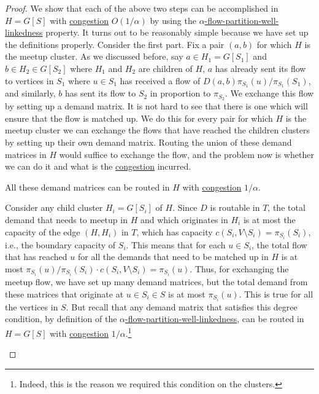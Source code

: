 \begin{proof}
	We show that each of the above two steps can be accomplished in \(H = G[S]\) with \hyperref[def:congestion]{congestion} \(O(1 / \alpha )\) by using the \hyperref[def:partition-and-boundary-well-linked]{\(\alpha \)-flow-partition-well-linkedness} property. It turns out to be reasonably simple because we have set up the definitions properly. Consider the first part. Fix a pair \((a, b)\) for which \(H\) is the meetup cluster. As we discussed before, say \(a \in H_1 = G[S_1]\) and \(b \in H_2 \in G[S_2]\) where \(H_1\) and \(H_2\) are children of \(H\), \(a\) has already sent its flow to vertices in \(S_1\) where \(u \in S_1\) has received a flow of \(D(a, b) \pi _{S_1}(u) / \pi _{S_1}(S_1)\), and similarly, \(b\) has sent its flow to \(S_2\) in proportion to \(\pi _{S_2}\). We exchange this flow by setting up a demand matrix. It is not hard to see that there is one which will ensure that the flow is matched up. We do this for every pair for which \(H\) is the meetup cluster we can exchange the flows that have reached the children clusters by setting up their own demand matrix. Routing the union of these demand matrices in \(H\) would suffice to exchange the flow, and the problem now is whether we can do it and what is the \hyperref[def:congestion]{congestion} incurred.
	\begin{claim}
		All these demand matrices can be routed in \(H\) with \hyperref[def:congestion]{congestion} \(1 / \alpha \).
	\end{claim}
	\begin{explanation}
		Consider any child cluster \(H_i = G[S_i]\) of \(H\). Since \(D\) is routable in \(T\), the total demand that needs to meetup in \(H\) and which originates in \(H_i\) is at most the capacity of the edge \((H, H_i)\) in \(T\), which has capacity \(c(S_i, V\setminus S_i) = \pi _{S_i}(S_i)\), i.e., the boundary capacity of \(S_i\). This means that for each \(u \in S_i\), the total flow that has reached \(u\) for all the demands that need to be matched up in \(H\) is at most \(\pi _{S_i}(u) / \pi _{S_i}(S_i) \cdot c(S_i, V\setminus S_i) = \pi _{S_i}(u)\). Thus, for exchanging the meetup flow, we have set up many demand matrices, but the total demand from these matrices that originate at \(u \in S_i \in S\) is at most \(\pi _{S_i}(u)\). This is true for all the vertices in \(S\). But recall that any demand matrix that satisfies this degree condition, by definition of the \hyperref[def:partition-and-boundary-well-linked]{\(\alpha \)-flow-partition-well-linkedness}, can be routed in \(H = G[S]\) with \hyperref[def:congestion]{congestion} \(1 / \alpha \).\footnote{Indeed, this is the reason we required this condition on the clusters.}

\end{explanation}
\end{proof}
